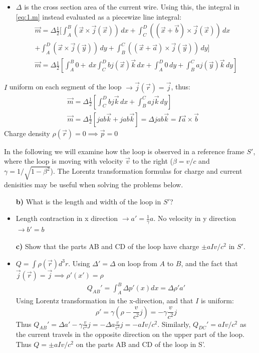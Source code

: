 \documentclass[11pt,a4paper]{report}
\newcounter{excount}[chapter]
\newenvironment{exercise}[1][]{\addtocounter{excount}{1} \noindent {\bf Problem
    \arabic{excount} \ \ #1}\hspace{2mm}}{\vspace{4mm}}
\begin{document}
\begin{exercise}
\begin{itemize}
\item $\Delta $ is the cross section area of the current wire. Using this, the integral in \eqref{eq:1.m} instead evaluated as a piecewize line integral:
\begin{align*}
\vec m = \Delta \frac{1}{2} [ \int_A^B(\vec x \times \vec j(\vec x))\,dx+\int_C^D((\vec x + \vec b )\times \vec j(\vec x))\,dx \\
+\int_A^D(\vec x \times \vec j(\vec y))\,dy+\int_B^C((\vec x+\vec a )\times \vec j(\vec y))\,dy  ] \\
\vec m =  \Delta \frac{1}{2}\left[ \int_A^B 0 + \,dx \int_C^D  bj(\vec x) \vec k \,dx + \int_A^D 0 \, dy+\int_B^C aj(\vec y)\vec k \,dy \right] 
\end{align*}
\end{itemize}
$I$ uniform on each segment of the loop $\rightarrow \vec j(\vec r) = \vec j$, thus: 
\begin{align*}
&\vec m =  \Delta \frac{1}{2}\left[\int_C^D  bj \vec k \,dx +\int_B^C aj\vec k \,dy \right]  \\
&\vec m =  \Delta \frac{1}{2}\left[ jab \vec k + jab \vec k \right]=\Delta j ab \vec k =  I \vec a \times \vec b
\end{align*}
Charge density $\rho (\vec r)=0 \implies \vec{p}=0$


In the following we will examine how the loop is observed in a reference frame $S'$, where the loop is moving with velocity $\vec v$ to the right ($\beta=v/c$ and $\gamma=1/\sqrt{1-\beta^2}$). The Lorentz transformation formulas for charge and current denisities may be useful when solving the problems below.

\begin{itemize}
\item[{\bf b)}] What is the length and width of the loop in $S'$?
\item Length contraction in x direction $\rightarrow a'=\frac{1}{\gamma}a$. No velocity in y direction $\rightarrow b'=b$

\item[{\bf c)}]Show that the parts AB and CD of the loop have charge $\pm aIv/c^2$ in $S'$.
\item $Q=\int \rho(\vec r) d^3r$. Using $\Delta'=\Delta$ on loop from $A$ to $B$, and the fact that $\vec j(\vec r) = \vec j \implies \rho'(x')=\rho$  
\begin{align*}
Q_{AB}'= \int_A^B \Delta p'(x)  dx =\Delta \rho' a'
\end{align*}
Using Lorentz transformation in the x-direction, and that $I$ is uniform:
\begin{equation}
\rho'=\gamma(\rho-\frac{v}{c^2} j)=-\gamma\frac{v}{c^2} j
\end{equation} 
Thus $Q_{AB}'=\Delta  a' -\gamma\frac{v}{c^2} j = -\Delta  a \frac{v}{c^2} j=-  aI v/c^2 $.
Similarly, $Q_{DC}'= aI v/c^2 $ as the current travels in the opposite direction on the upper part of the loop. Thus $Q=\pm aI v/c^2$ on the parts AB and CD of the loop in S'.


\end{itemize}
\end{exercise}
\end{document}
